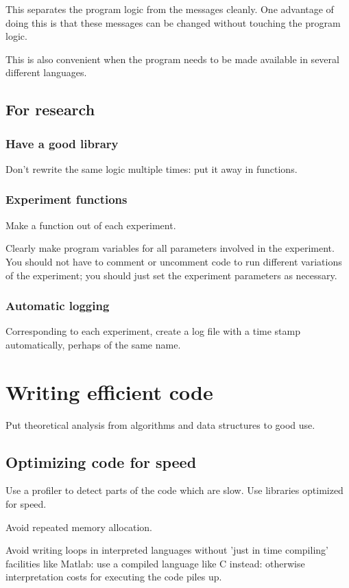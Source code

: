 \documentclass[oneside, article]{memoir}
\begin{document}
This separates the program logic from the messages cleanly. One advantage of doing this is that these messages can be changed without touching the program logic.

This is also convenient when the program needs to be made available in several different languages.

\section{For research}
\subsection{Have a good library}
Don't rewrite the same logic multiple times: put it away in functions.

\subsection{Experiment functions}
Make a function out of each experiment.

Clearly make program variables for all parameters involved in the experiment. You should not have to comment or uncomment code to run different variations of the experiment; you should just set the experiment parameters as necessary.

\subsection{Automatic logging}
Corresponding to each experiment, create a log file with a time stamp automatically, perhaps of the same name.


\chapter{Writing efficient code}
Put theoretical analysis from algorithms and data structures to good use.

\section{Optimizing code for speed}
Use a profiler to detect parts of the code which are slow. Use libraries optimized for speed.

Avoid repeated memory allocation.

Avoid writing loops in interpreted languages without 'just in time compiling' facilities like Matlab: use a compiled language like C instead: otherwise interpretation costs for executing the code piles up.
\end{document}
